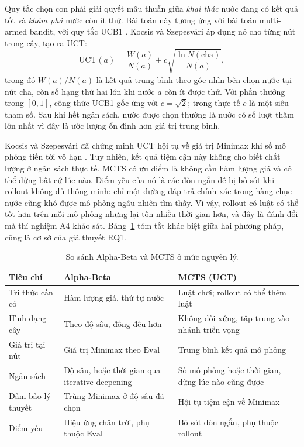 Quy tắc chọn con phải giải quyết mâu thuẫn giữa \emph{khai thác} nước đang có kết quả tốt và \emph{khám phá} nước còn ít thử. Bài toán này tương ứng với bài toán multi-armed bandit, với quy tắc UCB1 \cite{auer2002ucb}. Kocsis và Szepesvári \cite{kocsis2006uct} áp dụng nó cho từng nút trong cây, tạo ra UCT:
\begin{equation}
  \text{UCT}(a) = \frac{W(a)}{N(a)} + c \sqrt{\frac{\ln N(\text{cha})}{N(a)}},
  \label{eq:uct}
\end{equation}
trong đó $W(a)/N(a)$ là kết quả trung bình theo góc nhìn bên chọn nước tại nút cha, còn số hạng thứ hai lớn khi nước $a$ còn ít được thử. Với phần thưởng trong $[0, 1]$, công thức UCB1 gốc ứng với $c = \sqrt{2}$; trong thực tế $c$ là một siêu tham số. Sau khi hết ngân sách, nước được chọn thường là nước có số lượt thăm lớn nhất vì đây là ước lượng ổn định hơn giá trị trung bình.

Kocsis và Szepesvári đã chứng minh UCT hội tụ về giá trị Minimax khi số mô phỏng tiến tới vô hạn \cite{kocsis2006uct}. Tuy nhiên, kết quả tiệm cận này không cho biết chất lượng ở ngân sách thực tế. MCTS có ưu điểm là không cần hàm lượng giá và có thể dừng bất cứ lúc nào. Điểm yếu của nó là các đòn ngắn dễ bị bỏ sót khi rollout không đủ thông minh: chỉ một đường đáp trả chính xác trong hàng chục nước cũng khó được mô phỏng ngẫu nhiên tìm thấy. Vì vậy, rollout có luật có thể tốt hơn trên mỗi mô phỏng nhưng lại tốn nhiều thời gian hơn, và đây là đánh đổi mà thí nghiệm A4 khảo sát. Bảng~\ref{tab:lt-ab-mcts} tóm tắt khác biệt giữa hai phương pháp, cũng là cơ sở của giả thuyết RQ1.

\begin{table}[!htb]
  \centering\small
  \caption{So sánh Alpha-Beta và MCTS ở mức nguyên lý.}
  \label{tab:lt-ab-mcts}
  \begin{tabularx}{\textwidth}{@{}l >{\raggedright\arraybackslash}X >{\raggedright\arraybackslash}X@{}}
    \toprule
    \textbf{Tiêu chí} & \textbf{Alpha-Beta} & \textbf{MCTS (UCT)} \\
    \midrule
    Tri thức cần có & Hàm lượng giá, thứ tự nước & Luật chơi; rollout có thể thêm luật \\
    Hình dạng cây & Theo độ sâu, đồng đều hơn & Không đối xứng, tập trung vào nhánh triển vọng \\
    Giá trị tại nút & Giá trị Minimax theo $\text{Eval}$ & Trung bình kết quả mô phỏng \\
    Ngân sách & Độ sâu, hoặc thời gian qua iterative deepening & Số mô phỏng hoặc thời gian, dừng lúc nào cũng được \\
    Đảm bảo lý thuyết & Trùng Minimax ở độ sâu đã chọn & Hội tụ tiệm cận về Minimax \\
    Điểm yếu & Hiệu ứng chân trời, phụ thuộc $\text{Eval}$ & Bỏ sót đòn ngắn, phụ thuộc rollout \\
    \bottomrule
  \end{tabularx}
\end{table}


